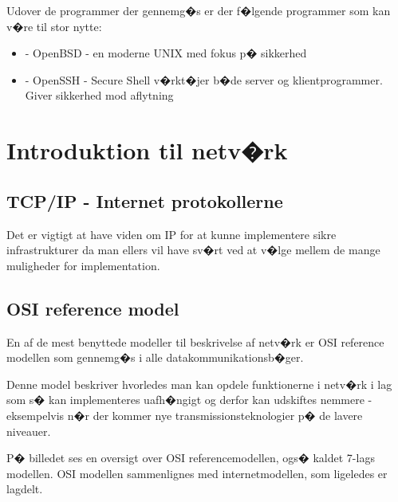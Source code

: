 \documentclass[a4paper,11pt,notitlepage]{oevelser}
\begin{document}
Udover de programmer der gennemg�s er der f�lgende programmer som kan
v�re til stor nytte:
\begin{itemize}
\item {} - OpenBSD - en moderne UNIX med
  fokus p� sikkerhed
\item {} - OpenSSH - Secure Shell
  v�rkt�jer b�de server og klientprogrammer. Giver sikkerhed mod aflytning
\end{itemize}

\rhead{\fancyplain{}{\bfseries \chaptername\ \thechapter}}




\chapter*{\color{titlecolor}Introduktion til netv�rk}
\label{chap:intro}

\section*{\color{titlecolor}TCP/IP - Internet protokollerne}
Det er vigtigt at have viden om IP for at kunne implementere sikre
infrastrukturer da man ellers vil have sv�rt ved at v�lge mellem de
mange muligheder for implementation.

\section*{\color{titlecolor}OSI reference model}
En af de mest benyttede modeller til beskrivelse af netv�rk er OSI
reference modellen som gennemg�s i alle datakommunikationsb�ger.

Denne model beskriver hvorledes man kan opdele funktionerne i netv�rk
i lag som s� kan implementeres uafh�ngigt og derfor kan udskiftes
nemmere - eksempelvis n�r der kommer nye transmissionsteknologier p�
de lavere niveauer.

P� billedet ses en oversigt over OSI referencemodellen, ogs� kaldet
7-lags modellen. OSI modellen sammenlignes med internetmodellen, som
ligeledes er lagdelt.
\end{document}
